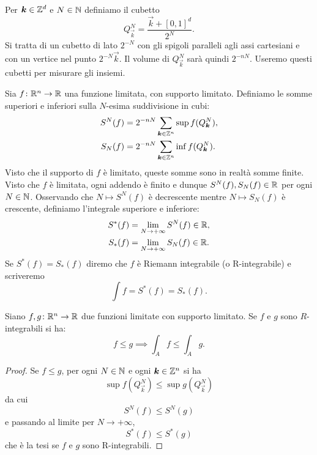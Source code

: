 Per $\boldsymbol k \in {\mathbb Z}^d$ e $N\in {\mathbb N}$ definiamo 
il cubetto 
\[
  Q^N_{\vec k} = \frac{\vec k + [0,1]^d}{2^N}.
\]
Si tratta di un cubetto di lato $2^{-N}$ con gli spigoli paralleli 
agli assi cartesiani e con un vertice nel punto $2^{-N} \vec k$.
Il volume di $Q^N_{\vec k}$ sarà quindi $2^{-nN}$.
Useremo questi cubetti per misurare gli insiemi.

\begin{definition}
  \label{def:integrale_riemann}
Sia $f\colon {\mathbb R}^n \to {\mathbb R}$ una funzione limitata, 
con supporto limitato.
Definiamo le somme superiori e inferiori sulla $N$-esima suddivisione in cubi:
\begin{align*}
    S^N(f) &= 2^{-nN}\sum_{\boldsymbol k\in {\mathbb Z}^n} \sup f(Q^N_{\boldsymbol k}), \\
    S_N(f) &= 2^{-nN}\sum_{\boldsymbol k\in {\mathbb Z}^n} \inf f(Q^N_{\boldsymbol k}).
\end{align*}
Visto che il supporto di $f$ è limitato, queste somme sono in realtà 
somme finite. Visto che $f$ è limitata, ogni addendo è finito e dunque 
$S^N(f), S_N(f) \in {\mathbb R}$ per ogni $N\in {\mathbb N}$.
Osservando che $N\mapsto S^N(f)$ è decrescente 
mentre $N\mapsto S_N(f)$ è crescente, definiamo
l'integrale superiore e inferiore:
\begin{align*}
    S^*(f) &= \lim_{N\to +\infty} S^N(f) \in {\mathbb R}, \\
    S_*(f) &= \lim_{N\to +\infty} S_N(f) \in {\mathbb R}.
\end{align*}
Se $S^*(f)=S_*(f)$ diremo che $f$ è Riemann integrabile (o R-integrabile)
e scriveremo
\[
  \int f = S^*(f) = S_*(f).
\]
\end{definition}

\begin{theorem}
Siano $f,g\colon {\mathbb R}^n\to{\mathbb R}$ due funzioni limitate con supporto limitato.
Se $f$ e $g$ sono $R$-integrabili si ha:
\[
  f \le g \implies \int_A f \le \int_A g.
\]
\end{theorem}
%
\begin{proof}
Se $f\le g$, per ogni $N\in {\mathbb N}$ e ogni $\boldsymbol k \in {\mathbb Z}^n$ si ha 
\[
    \sup f(Q^N_{\vec k}) \le \sup g(Q^N_{\vec k}) 
\]
da cui 
\[
    S^N(f) \le S^N(g)
\]
e passando al limite per $N\to +\infty$,
\[
  S^*(f) \le S^*(g)
\]
che è la tesi se $f$ e $g$ sono R-integrabili.
\end{proof}

